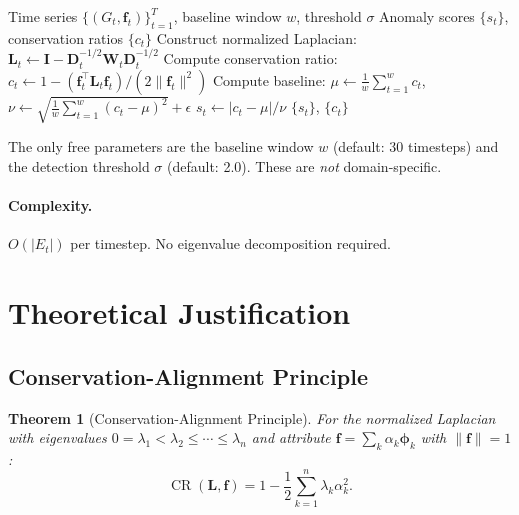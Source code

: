 \documentclass[11pt,a4paper]{article}
\newtheorem{theorem}{Theorem}[section]
\newcommand{\bff}{\mathbf{f}}
\newcommand{\bL}{\mathbf{L}}
\newcommand{\bW}{\mathbf{W}}
\newcommand{\bD}{\mathbf{D}}
\newcommand{\bphi}{\boldsymbol{\phi}}
\DeclareMathOperator{\CR}{CR}
\begin{document}
\begin{algorithm}[ht]
\caption{ConservationRegimeDetector}\label{alg:crd}
\begin{algorithmic}[1]
  \Require Time series $\{(G_t, \bff_t)\}_{t=1}^T$, baseline window $w$, threshold $\sigma$
  \Ensure Anomaly scores $\{s_t\}$, conservation ratios $\{c_t\}$
  \Statex
    \State Construct normalized Laplacian: $\bL_t \leftarrow \mathbf{I} - \bD_t^{-1/2}\bW_t\bD_t^{-1/2}$
    \State Compute conservation ratio: $c_t \leftarrow 1 - (\bff_t^\top \bL_t \bff_t) / (2\|\bff_t\|^2)$
  \EndFor
  \Statex
  \State Compute baseline: $\mu \leftarrow \frac{1}{w}\sum_{t=1}^{w} c_t$, \;
    $\nu \leftarrow \sqrt{\frac{1}{w}\sum_{t=1}^{w}(c_t - \mu)^2} + \epsilon$
    \State $s_t \leftarrow |c_t - \mu| / \nu$
  \EndFor
  \State \Return $\{s_t\}$, $\{c_t\}$
\end{algorithmic}
\end{algorithm}

The only free parameters are the baseline window $w$ (default: 30 timesteps)
and the detection threshold $\sigma$ (default: 2.0).  These are \emph{not}
domain-specific.

\paragraph{Complexity.}
$O(|E_t|)$ per timestep.  No eigenvalue decomposition required.

\section{Theoretical Justification}
\label{sec:theory}

\subsection{Conservation-Alignment Principle}

\begin{theorem}[Conservation-Alignment Principle]\label{thm:cap}
For the normalized Laplacian with eigenvalues $0 = \lambda_1 < \lambda_2 \leq
\cdots \leq \lambda_n$ and attribute $\bff = \sum_k \alpha_k \bphi_k$ with
$\|\bff\| = 1$:
\begin{equation}
  \CR(\bL, \bff) = 1 - \frac{1}{2}\sum_{k=1}^{n} \lambda_k \alpha_k^2.
\end{equation}
\end{theorem}
\end{document}
